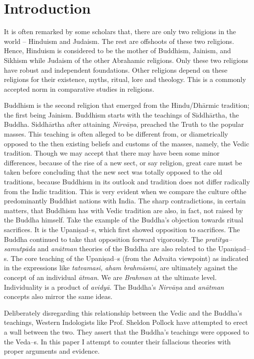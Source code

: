 \section*{Introduction}

It is often remarked by some scholars that, there are only two religions in the world – Hinduism and Judaism. The rest are offshoots of these two religions. Hence, Hinduism is considered to be the mother of Buddhism, Jainism, and Sikhism while Judaism of the other Abrahamic religions. Only these two religions have robust and independent foundations. Other religions depend on these religions for their existence, myths, ritual, lore and theology. This is a commonly accepted norm in comparative studies in religions.

Buddhism is the second religion that emerged from the Hindu/Dhārmic tradition; the first being Jainism. Buddhism starts with the teachings of Siddhārtha, the Buddha. Siddhārtha after attaining \textit{Nirvāṇa}, preached the Truth to the popular masses. This teaching is often alleged to be different from, or diametrically opposed to the then existing beliefs and customs of the masses, namely, the Vedic tradition. Though we may accept that there may have been some minor differences, because of the rise of a new sect, or say religion, great care must be taken before concluding that the new sect was totally opposed to the old traditions, because Buddhism in its outlook and tradition does not differ radically from the Indic tradition. This is very evident when we compare the culture ofthe predominantly Buddhist nations with India. The sharp contradictions, in certain matters, that Buddhism has with Vedic tradition are also, in fact, not raised by the Buddha himself. Take the example of the Buddha’s objection towards ritual sacrifices. It is the Upaniṣad–s, which first showed opposition to sacrifices. The Buddha continued to take that opposition forward vigorously. The \textit{pratītya–samutpāda} and \textit{anātman} theories of the Buddha are also related to the Upaniṣad–s. The core teaching of the Upaniṣad–s (from the Advaita viewpoint) as indicated in the expressions like \textit{tatvamasi, aham brahmāsmi}, are ultimately against the concept of an individual \textit{ātman}. We are \textit{Brahman} at the ultimate level. Individuality is a product of \textit{avidyā}. The Buddha’s \textit{Nirvāṇa} and \textit{anātman} concepts also mirror the same ideas.

Deliberately disregarding this relationship between the Vedic and the Buddha’s teachings, Western Indologists like Prof. Sheldon Pollock have attempted to erect a wall between the two. They assert that the Buddha’s teachings were opposed to the Veda–s. In this paper I attempt to counter their fallacious theories with proper arguments and evidence.

